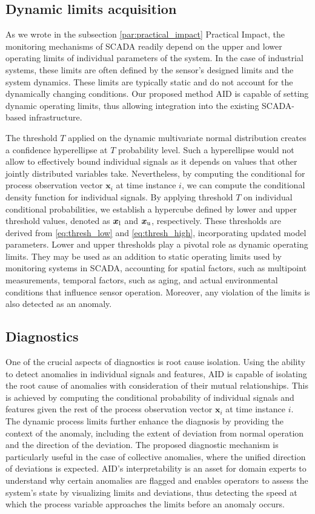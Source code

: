 \subsection{Dynamic limits acquisition}\label{limits}
As we wrote in the subsection \ref{par:practical_impact} Practical Impact, the monitoring mechanisms of SCADA readily depend on the upper and lower operating limits of individual parameters of the system. In the case of industrial systems, these limits are often defined by the sensor's designed limits and the system dynamics. These limits are typically static and do not account for the dynamically changing conditions. Our proposed method AID is capable of setting dynamic operating limits, thus allowing integration into the existing SCADA-based infrastructure.

The threshold $T$ applied on the dynamic multivariate normal distribution creates a confidence hyperellipse at $T$ probability level. Such a hyperellipse would not allow to effectively bound individual signals as it depends on values that other jointly distributed variables take. Nevertheless, by computing the conditional for process observation vector $\boldsymbol{x}_i$ at time instance $i$, we can compute the conditional density function for individual signals. By applying threshold $T$ on individual conditional probabilities, we establish a hypercube defined by lower and upper threshold values, denoted as $\boldsymbol{x} _{\text{l}}$ and $\boldsymbol{x} _{\text{u}}$, respectively. These thresholds are derived from \eqref{eq:thresh_low} and \eqref{eq:thresh_high}, incorporating updated model parameters. Lower and upper thresholds play a pivotal role as dynamic operating limits. They may be used as an addition to static operating limits used by monitoring systems in SCADA, accounting for spatial factors, such as multipoint measurements, temporal factors, such as aging, and actual environmental conditions that influence sensor operation. Moreover, any violation of the limits is also detected as an anomaly.

\subsection{Diagnostics}\label{diagnosis}
One of the crucial aspects of diagnostics is root cause isolation. Using the ability to detect anomalies in individual signals and features, AID is capable of isolating the root cause of anomalies with consideration of their mutual relationships. This is achieved by computing the conditional probability of individual signals and features given the rest of the process observation vector $\boldsymbol{x}_i$ at time instance $i$. The dynamic process limits further enhance the diagnosis by providing the context of the anomaly, including the extent of deviation from normal operation and the direction of the deviation. The proposed diagnostic mechanism is particularly useful in the case of collective anomalies, where the unified direction of deviations is expected. AID's interpretability is an asset for domain experts to understand why certain anomalies are flagged and enables operators to assess the system's state by visualizing limits and deviations, thus detecting the speed at which the process variable approaches the limits before an anomaly occurs.

